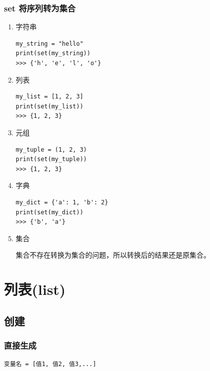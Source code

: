 \subsubsection{set 将序列转为集合}
\begin{enumerate}[label=\arabic*)]
    \item 字符串
\begin{lstlisting}[style=demostyle,numbers=none]
my_string = "hello"
print(set(my_string))
>>> {'h', 'e', 'l', 'o'}
\end{lstlisting}

    \item 列表
\begin{lstlisting}[style=demostyle,numbers=none]
my_list = [1, 2, 3]
print(set(my_list))
>>> {1, 2, 3}
\end{lstlisting}

    \item 元组
\begin{lstlisting}[style=demostyle,numbers=none]
my_tuple = (1, 2, 3)
print(set(my_tuple))
>>> {1, 2, 3}
\end{lstlisting}
    
    \item 字典
\begin{lstlisting}[style=demostyle,numbers=none]
my_dict = {'a': 1, 'b': 2}
print(set(my_dict))
>>> {'b', 'a'}
\end{lstlisting}

    \item 集合

    集合不存在转换为集合的问题，所以转换后的结果还是原集合。

\end{enumerate}





\section{列表(list)}
\subsection{创建}
\subsubsection{直接生成}
\begin{lstlisting}[style=demostyle,numbers=none]
变量名 = [值1, 值2, 值3,...]
\end{lstlisting}

